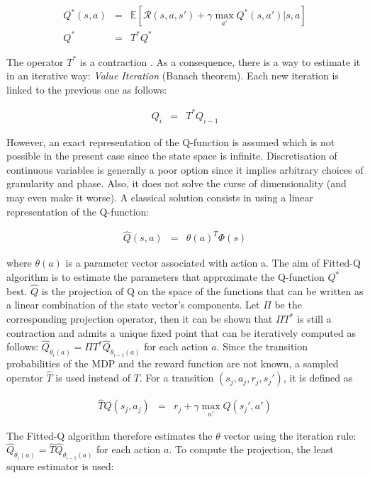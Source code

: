 			\begin{eqnarray}
				Q^*(s,a) & = & \mathbb{E}[\mathscr{R} (s,a,s') + \gamma \max_{a'} Q^*(s,a') | s, a] \\
				Q^* & = & T^* Q^*
			\end{eqnarray}
			
				The operator $T^*$ is a contraction \cite{Bellman1957}. As a consequence, there is a way to estimate it in an iterative way: \textit{Value Iteration} (Banach theorem). Each new iteration is linked to the previous one as follows:
        
			\begin{eqnarray}
				Q_i & = & T^* Q_{i-1}
			\end{eqnarray}
						
					However, an exact representation of the Q-function is assumed which is not possible in the present case since the state space is infinite. Discretisation of continuous variables is generally a poor option since it implies arbitrary choices of granularity and phase. Also, it does not solve the curse of dimensionality (and may even make it worse). A classical solution consists in using a linear representation of the Q-function:
        
			\begin{eqnarray}
				\hat{Q}(s,a) & = & \theta(a)^T \Phi(s)
			\end{eqnarray}
            
      	where $\theta(a)$ is a parameter vector associated with action a. The aim of Fitted-Q algorithm is to estimate the parameters that approximate the Q-function $Q^*$ best. $\hat{Q}$ is the projection of Q on the space of the functions that can be written as a linear combination of the state vector's components. Let $\Pi$ be the corresponding projection operator, then it can be shown that $\Pi T^*$ is still a contraction and admits a unique fixed point that can be iteratively computed as follows: $\hat{Q}_{\theta_i (a)} = \Pi T^* \hat{Q}_{\theta_{i-1} (a)}$ for each action $a$. Since the transition probabilities of the MDP and the reward function are not known, a sampled operator $\hat{T}$ is used instead of $T$. For a transition $(s_j,a_j,r_j,s_j')$, it is defined as
        
				\begin{eqnarray}
					\hat{T} Q(s_j,a_j) & = & r_j + \gamma \max_{a'} Q(s_j',a')
				\end{eqnarray}
            
      	The Fitted-Q algorithm therefore estimates the $\theta$ vector using the iteration rule: $\hat{Q}_{\theta_i (a)} = \hat{T} \hat{Q}_{\theta_{i-1} (a)}$ for each action $a$. To compute the projection, the least square estimator is used:
        
